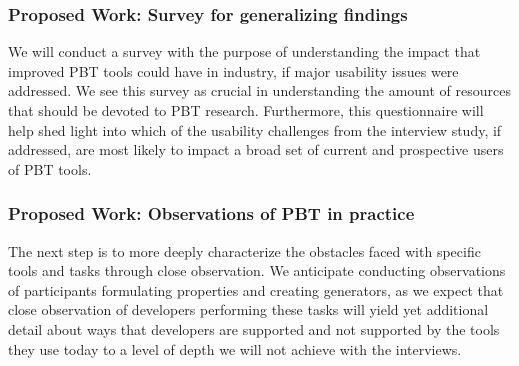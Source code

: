 \subsubsection{Proposed Work: Survey for generalizing findings}
\label{sec:survey}




We will conduct a survey with the purpose of understanding the impact that
improved PBT tools could have in industry, if major usability issues were
addressed. We see this survey as crucial in understanding the amount of
resources that should be devoted to PBT research. Furthermore, this
questionnaire will help shed light into which of the usability challenges from
the interview study, if addressed, are most likely to impact a broad set of
current and prospective users of PBT tools.

\subsubsection{Proposed Work: Observations of PBT in practice}
\label{sec:observations}


The next step is to more deeply characterize the obstacles faced with specific
tools and tasks through close observation. We anticipate conducting observations
of participants formulating properties and creating generators, as we expect
that close observation of developers performing these tasks will yield yet
additional detail about ways that developers are supported and not supported by
the tools they use today to a level of depth we will not achieve with the
interviews.

